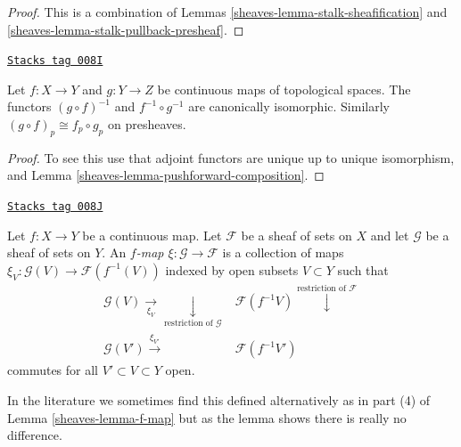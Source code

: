 \begin{proof}

This is a combination of Lemmas \ref{sheaves-lemma-stalk-sheafification}
and \ref{sheaves-lemma-stalk-pullback-presheaf}.
\end{proof}

\begin{lemma}
\label{sheaves-lemma-pullback-composition}
\href{https://stacks.math.columbia.edu/tag/008I}{\texttt{Stacks tag 008I}}

Let $f : X \to Y$ and $g : Y \to Z$ be continuous maps
of topological spaces. The functors $(g \circ f)^{-1}$
and $f^{-1} \circ g^{-1}$ are canonically isomorphic.
Similarly $(g \circ f)_p \cong f_p \circ g_p$ on
presheaves.
\end{lemma}

\begin{proof}

To see this
use that adjoint functors are unique up to unique isomorphism,
and Lemma \ref{sheaves-lemma-pushforward-composition}.
\end{proof}

\begin{definition}[F map]
\label{sheaves-definition-f-map}
\href{https://stacks.math.columbia.edu/tag/008J}{\texttt{Stacks tag 008J}}

Let $f : X \to Y$ be a continuous map.
Let $\mathcal{F}$ be a sheaf of sets on $X$ and
let $\mathcal{G}$ be a sheaf of sets on $Y$.
An {\it $f$-map $\xi : \mathcal{G} \to \mathcal{F}$}
is a collection of maps
$\xi_V : \mathcal{G}(V) \to \mathcal{F}(f^{-1}(V))$
indexed by open subsets $V \subset Y$ such that
$$
\begin{array}{cc}\mathcal{G}(V) \underset{\xi_V}{\longrightarrow}\underset{\text{restriction of }\mathcal{G}}{\downarrow} & \mathcal{F}(f^{-1}V) \overset{\text{restriction of }\mathcal{F}}{\downarrow} \\ \mathcal{G}(V') \overset{\xi_{V'}}{\longrightarrow} & \mathcal{F}(f^{-1}V')\end{array}
$$
commutes for all $V' \subset V \subset Y$ open.
\end{definition}

In the literature we sometimes find this defined alternatively
as in part (4) of Lemma \ref{sheaves-lemma-f-map} but as the lemma shows there
is really no difference.


